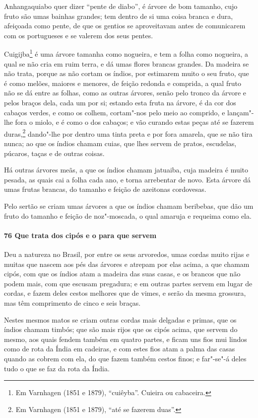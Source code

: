\begin{linenumbers}
Anhangaquiabo quer dizer ``pente de diabo'', é árvore de bom tamanho, cujo fruto são umas
bainhas grandes; tem dentro de si uma coisa branca e dura, afeiçoada como pente, de que os
gentios se aproveitavam antes de comunicarem com os portugueses e se valerem dos seus
pentes.

Cuigijba\footnote{ Em Varnhagen (1851 e 1879), ``cuiêyba''. Cuieira ou cabaceira.} é uma
árvore tamanha como nogueira, e tem a folha como nogueira, a qual se não cria em ruim
terra, e dá umas flores brancas grandes. Da madeira se não trata, porque as não cortam os
índios, por estimarem muito o seu fruto, que é como melões, maiores e menores, de feição
redonda e comprida, a qual fruto não se dá entre as folhas, como as outras árvores, senão
pelo tronco da árvore e pelos braços dela, cada um por si; estando esta fruta na árvore, é
da cor dos cabaços verdes, e como os colhem, cortam"-nos pelo meio ao comprido, e
lançam"-lhe fora o miolo, e é como o dos cabaços; e vão curando estas peças até se fazerem
duras,\footnote{ Em Varnhagen (1851 e 1879), ``até se fazerem duas''.} dando"-lhe por
dentro uma tinta preta e por fora amarela, que se não tira nunca; ao que os índios chamam
cuias, que lhes servem de pratos, escudelas, púcaros, taças e de outras coisas.

Há outras árvores meãs, a que os índios chamam jatuaiba, cuja madeira é muito pesada, as
quais cai a folha cada ano, e torna arrebentar de novo. Esta árvore dá umas frutas
brancas, do tamanho e feição de azeitonas cordovesas.

Pelo sertão se criam umas árvores a que os índios chamam beribebas, que dão um fruto do
tamanho e feição de noz"-moscada, o qual amaruja e requeima como ela.

\paragraph{76 Que trata dos cipós e o para que servem}\quad
Deu a natureza no Brasil, por entre os seus arvoredos, umas cordas muito rijas e muitas
que nascem aos pés das árvores e atrepam por elas acima, a que chamam cipós, com que os
índios atam a madeira das suas casas, e os brancos que não podem mais, com que escusam
pregadura; e em outras partes servem em lugar de cordas, e fazem deles cestos melhores que
de vimes, e serão da mesma grossura, mas têm comprimento de cinco e seis braças.

Nestes mesmos matos se criam outras cordas mais delgadas e primas, que os índios chamam
timbós; que são mais rijos que os cipós acima, que servem do mesmo, aos quais fendem
também em quatro partes, e ficam uns fios mui lindos como de rota da Índia em cadeiras, e
com estes fios atam a palma das casas quando as cobrem com ela, do que fazem também cestos
finos; e far"-se"-á deles tudo o que se faz da rota da Índia.


\end{linenumbers}
